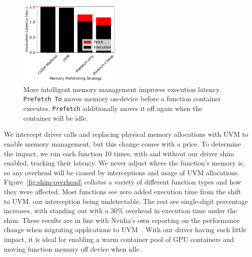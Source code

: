 \begin{figure}
  \includegraphics[width=0.45\textwidth]{../graphs/mem-move/f16-i20-driver-mps-move.pdf}
  \vspace*{\captionspace}
  \caption{More intelligent memory management improves execution latency. 
    \texttt{Prefetch To} moves memory on-device before a function container executes.
    \texttt{Prefetch} additionally moves it off again when the container will be idle.}
    \label{fig:mem-prefetch}
    \vspace{\myfigspace}
\end{figure}


We intercept driver calls and replacing physical memory allocations with UVM to enable memory management, but this change comes with a price.
To determine the impact, we run each function 10 times, with and without our driver shim enabled, tracking their latency.
We never adjust where the function's memory is, so any overhead will be caused by interceptions and usage of UVM allocations.
Figure~\ref{fig:shim-overhead} collates a variety of different function types and how they were affected.
Most functions see zero added execution time from the shift to UVM, our interception being undetectable.
The rest see single-digit percentage increases, with  standing out with a 30\% overhead in execution time under the shim.
These results are in line with Nvidia's own reporting on the performance change when migrating applications to UVM~\cite{nvidia-uvm}.
With our driver having such little impact, it is ideal for enabling a warm container pool of GPU containers and moving function memory off device when idle.

